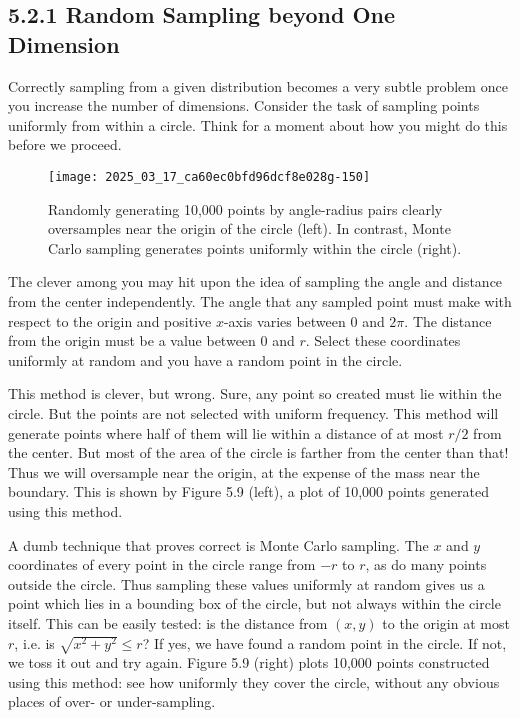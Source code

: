 \documentclass[10pt]{article}
\begin{document}
\subsection*{5.2.1 Random Sampling beyond One Dimension}
Correctly sampling from a given distribution becomes a very subtle problem once you increase the number of dimensions. Consider the task of sampling points uniformly from within a circle. Think for a moment about how you might do this before we proceed.\
\
\begin{figure}[h]
\centering
\texttt{[image: 2025\_03\_17\_ca60ec0bfd96dcf8e028g-150]}
\caption{Randomly generating 10,000 points by angle-radius pairs clearly oversamples near the origin of the circle (left). In contrast, Monte Carlo sampling generates points uniformly within the circle (right).}
\end{figure}

The clever among you may hit upon the idea of sampling the angle and distance from the center independently. The angle that any sampled point must make with respect to the origin and positive $x$-axis varies between 0 and $2 \pi$. The distance from the origin must be a value between 0 and $r$. Select these coordinates uniformly at random and you have a random point in the circle.

This method is clever, but wrong. Sure, any point so created must lie within the circle. But the points are not selected with uniform frequency. This method will generate points where half of them will lie within a distance of at most $r / 2$ from the center. But most of the area of the circle is farther from the center than that! Thus we will oversample near the origin, at the expense of the mass near the boundary. This is shown by Figure 5.9 (left), a plot of 10,000 points generated using this method.

A dumb technique that proves correct is Monte Carlo sampling. The $x$ and $y$ coordinates of every point in the circle range from $-r$ to $r$, as do many points outside the circle. Thus sampling these values uniformly at random gives us a point which lies in a bounding box of the circle, but not always within the circle itself. This can be easily tested: is the distance from $(x, y)$ to the origin at most $r$, i.e. is $\sqrt{x^{2}+y^{2}} \leq r$? If yes, we have found a random point in the circle. If not, we toss it out and try again. Figure 5.9 (right) plots 10,000 points constructed using this method: see how uniformly they cover the circle, without any obvious places of over- or under-sampling.
\end{document}

